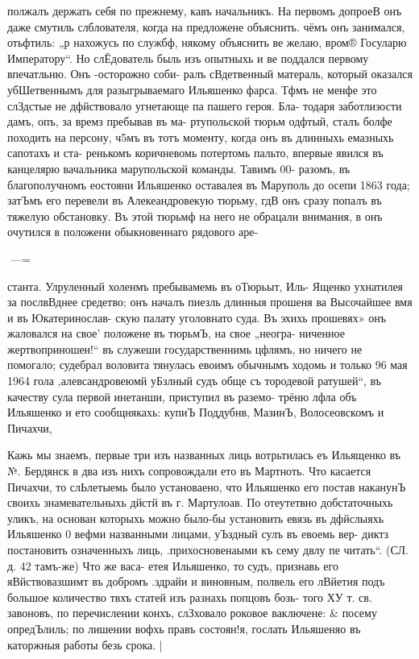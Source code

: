 полжалъ держать себя по прежнему, кавъ начальникъ. На
первомъ допроеВ онъ даже смутиль слблователя, когда на
предложене объяснить. чёмъ онъ занимался, отьфтиль: „р
нахожусь по службф, някому объяснить ве желаю, вром®
Госуларю Императору“. Но слЁдователь быль изъ опытныхь
и ве поддался первому впечатльню. Онъ -осторожно соби-
ралъ сВдетвенный матераль, который оказался убШетвеннымъ
для разыгрываемаго Ильяшенко фарса. Тфмъ не менфе это
слЗдстые не дфйствовало угнетающе па пашего героя. Бла-
тодаря заботлизости дамъ, опъ, за времз пребывав въ ма-
ртупольской тюрьм%
одфтый, сталъ болфе походить на персону, ч5мъ въ тотъ
моменту, когда онъ въ длинныхь емазныхь сапотахъ и ста-
ренькомъ коричневомь потертомь пальто, впервые явился въ
канцелярю вачальника марупольской команды. Тавимъ 00-
разомъ, въ благополучномъ еостояни Ильяшенко оставалея
въ Маруполь до осепи 1863 года; затЪмъ его перевели въ
Алекеандровекую тюрьму, гдВ онъ сразу попалъ въ тяжелую
обстановку. Въ этой тюрьмф на него не обрацали внимания,
в онъ очутился в положени обыкновеннаго рядового аре-

—=

станта. Улруленный холенмъ пребывамемь въ оТюрьыт, Иль-
Ященко ухнатилея за послвВднее средетво; онъ началъ пиезль
длинныя прошеня ва Высочайшее вмя и въ Юкатеринослав-
скую палату уголовнато суда. Въ эхихь прошевях» онъ
жаловался на свое’ положене въ тюрьмЪ, на свое „неогра-
ниченное жертвоприношен!“ въ служеши государственнимь
цфлямъ, но ничего не помогало; судебрал воловита тянулась
евоимъ обычнымъ ходомь и только 96 мая 1964 гола
‚алевсандровеюмй уБзлный судъ обще съ тородевой ратушей“,
въ качеству сула первой инетанши, приступил въ раземо-
трёню лфла объ Ильяшенко и ето сообщнякахь: купиЪ
Поддубнв, МазинЪ, Волосеовскомъ и Пичахчи,

Кажь мы знаемъ, первые три изъ названных лиць
вотрьтилась еъ Ильященко въ №. Бердянск в два изъ нихъ
сопровождали ето въ Мартноть. Что касается Пичахчи, то
слЬлетыемь было установаено, что Ильяшенко его постав
наканунЪ своихь знамевательныхь дйстй въ г. Мартулоав.
По отеутетвно добстаточныхь уликъ, на основан которыхь
можно было-бы установить евязь въ дфйслыяхь Ильяшенко
0 вефми названными лицами, уЪздный сулъ въ евоемь вер-
диктз постановить означенныхъ лиць, .прихосновенаыми къ
сему двлу пе читать“. (СЛ. д. 42 тамъ-же) Что же васа-
етея Ильяшенко, то судъ, признавь его яВйствовазшимт въ
добромъ .здрайи и виновным, полвель его лВйетия подъ
большое количество твхъ статей изъ разнахь попцовъ бозь-
того ХУ т. св. завоновъ, по перечислении конхъ, слЗховало
роковое ваключене: & посему опредЪлиль; по лишении вофхь
правъ состоян!я, гослать Ильяшеняо въ каторжныя работы
безь срока. |


